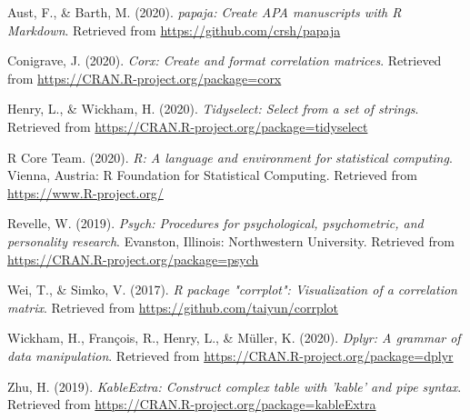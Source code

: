 \documentclass[
  english,
  man]{apa6}
\begin{document}
\begingroup
\setlength{\parindent}{-0.5in}
\setlength{\leftskip}{0.5in}

\hypertarget{refs}{}
\leavevmode\hypertarget{ref-R-papaja}{}%
Aust, F., \& Barth, M. (2020). \emph{papaja: Create APA manuscripts with R Markdown}. Retrieved from \url{https://github.com/crsh/papaja}

\leavevmode\hypertarget{ref-R-corx}{}%
Conigrave, J. (2020). \emph{Corx: Create and format correlation matrices}. Retrieved from \url{https://CRAN.R-project.org/package=corx}

\leavevmode\hypertarget{ref-R-tidyselect}{}%
Henry, L., \& Wickham, H. (2020). \emph{Tidyselect: Select from a set of strings}. Retrieved from \url{https://CRAN.R-project.org/package=tidyselect}

\leavevmode\hypertarget{ref-R-base}{}%
R Core Team. (2020). \emph{R: A language and environment for statistical computing}. Vienna, Austria: R Foundation for Statistical Computing. Retrieved from \url{https://www.R-project.org/}

\leavevmode\hypertarget{ref-R-psych}{}%
Revelle, W. (2019). \emph{Psych: Procedures for psychological, psychometric, and personality research}. Evanston, Illinois: Northwestern University. Retrieved from \url{https://CRAN.R-project.org/package=psych}

\leavevmode\hypertarget{ref-R-corrplot2017}{}%
Wei, T., \& Simko, V. (2017). \emph{R package "corrplot": Visualization of a correlation matrix}. Retrieved from \url{https://github.com/taiyun/corrplot}

\leavevmode\hypertarget{ref-R-dplyr}{}%
Wickham, H., François, R., Henry, L., \& Müller, K. (2020). \emph{Dplyr: A grammar of data manipulation}. Retrieved from \url{https://CRAN.R-project.org/package=dplyr}

\leavevmode\hypertarget{ref-R-kableExtra}{}%
Zhu, H. (2019). \emph{KableExtra: Construct complex table with 'kable' and pipe syntax}. Retrieved from \url{https://CRAN.R-project.org/package=kableExtra}

\endgroup
\end{document}
